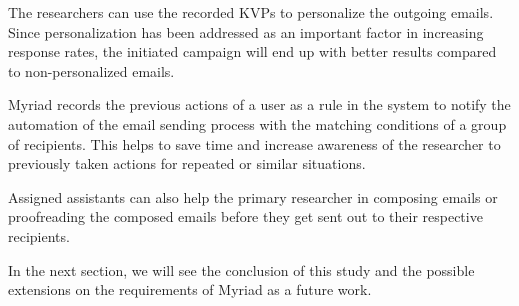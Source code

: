 The researchers can use the recorded \ac{KVP}s to personalize the outgoing emails. Since personalization has been addressed as an important factor in increasing response rates, the initiated campaign will end up with better results compared to non-personalized emails.
\vspace{1cm}

Myriad records the previous actions of a user as a rule in the system to notify the automation of the email sending process with the matching conditions of a group of recipients. This helps to save time and increase awareness of the researcher to previously taken actions for repeated or similar situations.
\vspace{1cm}

Assigned assistants can also help the primary researcher in composing emails or proofreading the composed emails before they get sent out to their respective recipients.
\vspace{1cm}

In the next section, we will see the conclusion of this study and the possible extensions on the requirements of Myriad as a future work.

\clearemptydoublepage

